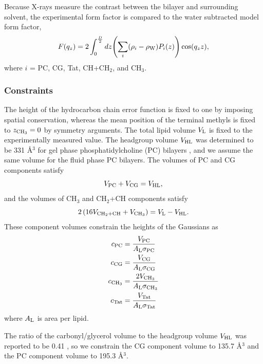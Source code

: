 Because X-rays measure the contrast between the bilayer and surrounding solvent, 
the experimental form factor is compared to the water subtracted model
form factor,
\begin{equation}
  F(q_z) = 2\int_0^{\frac{D}{2}} \mathop{dz} \mathopen{}\left( 
    \sum_i(\rho_i-\rho_\textrm{W})P_i(z)
   \right)\mathclose{} \cos(q_zz),
\end{equation}
where $i$ = PC, CG, Tat, CH+CH$_2$, and CH$_3$.

\subsubsection{Constraints}
The height of the hydrocarbon chain error function is fixed to one by imposing
spatial conservation, whereas the mean position of the terminal methyls is
fixed to $z_{\textrm{CH}_3}=0$ by symmetry arguments. The total lipid volume
$V_\textrm{L}$ is fixed to the experimentally measured value. 
The headgroup volume $V_\textrm{HL}$ was determined to be 331 \AA$^3$ for 
gel phase phosphatidylcholine (PC) bilayers \cite{Tristram-Nagle02},
and we assume the same volume for the fluid phase PC bilayers.
The volumes of PC and CG components satisfy
\begin{equation}
  V_\textrm{PC} + V_\textrm{CG} = V_\textrm{HL},
\end{equation}
and the volumes of CH$_3$ and CH$_2$+CH components satisfy
\begin{equation}
  2\left(16V_{\textrm{CH}_2+\textrm{CH}} + V_{\textrm{CH}_3}\right) = V_\textrm{L}-V_\textrm{HL}.
\end{equation}
These component volumes constrain the heights of the Gaussians as
\begin{align}
  c_\textrm{PC} &= \frac{V_\textrm{PC}}{A_\textrm{L}\sigma_\textrm{PC}} \\
  c_\textrm{CG} &= \frac{V_\textrm{CG}}{A_\textrm{L}\sigma_\textrm{CG}} \\
  c_{\textrm{CH}_3} &= \frac{2V_{\textrm{CH}_3}}{A_\textrm{L}\sigma_{\textrm{CH}_3}} \\
  c_\textrm{Tat} &= \frac{V_\textrm{Tat}}{A_\textrm{L}\sigma_\textrm{Tat}}
\end{align}
where $A_\textrm{L}$ is area per lipid.

The ratio of 
the carbonyl/glycerol volume to the headgroup volume $V_\textrm{HL}$ was
reported to be 0.41 \cite{Braun13}, so we constrain the CG
component volume to 135.7 \AA$^3$ and the PC component volume to 
195.3 \AA$^3$. 


